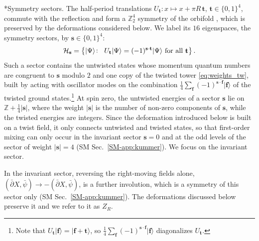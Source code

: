 \documentclass[aps,twocolumn,preprintnumbers,groupedaddress,nofootinbib,prl]{revtex4-2}
\makeatletter
\renewcommand\paragraph{\@startsection{paragraph}{4}{\parindent}{\z@}{-1em}{\normalfont\normalsize\bfseries}}
\newcommand{\bs}{\mathbf s}
\newcommand{\bt}{\mathbf t}
\newcommand{\bff}{\mathbf f}
\makeatother
\begin{document}
\paragraph*{Symmetry sectors.}
The half-period translations $U_\bt\colon  x\mapsto x+\pi R\,\bt$, $\bt\in\{0,1\}^4$, commute with the reflection and form a $\mathbb Z_2^4$ symmetry of the orbifold \cite{Taormina:2011rr,Gaberdiel:2013psa}, which is preserved by the deformations considered below. We label its $16$ eigenspaces, the symmetry sectors, by $\bs\in\{0,1\}^4$:
\begin{equation}
 {\cal H}_\bs = \big\{ |\Psi\rangle\colon \;\; U_\bt |\Psi \rangle = (-1)^{\bs \cdot \bt} |\Psi \rangle  \text{ for all } \bt \big\}\,.
\end{equation}
Such a sector contains the untwisted states whose momentum quantum numbers are congruent to $\bs$ modulo $2$ and one copy of the twisted tower \eqref{eq:weights_tw}, built by acting with oscillator modes on the combination $\frac14\sum_\bff(-1)^{\bs\cdot\bff}|\bff\rangle$ of the twisted ground states.\footnote{Note that $U_\bt |\bff\rangle = |\bff+\bt\rangle$, so $\frac14\sum_\bff(-1)^{\bs\cdot\bff}|\bff\rangle$ diagonalizes $U_{\bt}$.} At spin zero, the untwisted energies of a sector $\bs$ lie on $\mathbb Z+\frac14|\bs|$, where the weight $|\bs|$ is the number of non-zero components of $\bs$, while the twisted energies are integers. Since the deformation introduced below is built on a twist field, it only connects untwisted and twisted states, so that first-order mixing can only occur in the invariant sector $\bs=0$ and at the odd levels of the sector of weight $|\bs|=4$ (SM Sec.~\ref{SM-app:kummer}). We focus on the invariant sector.

In the invariant sector, reversing the right-moving fields alone, $(\bar\partial X,\bar\psi)\to-(\bar\partial X,\bar\psi)$, is a further involution, which is a symmetry of this sector only (SM Sec.~\ref{SM-app:kummer}). The deformations discussed below preserve it and we refer to it as $Z_R$.\\
\end{document}
